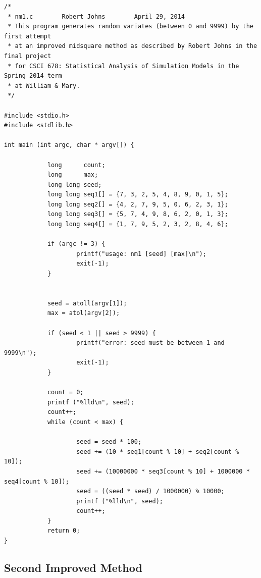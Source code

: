 \documentclass[11pt]{article}
\begin{document}
\begin{verbatim}/* 
 * nm1.c		Robert Johns		April 29, 2014
 * This program generates random variates (between 0 and 9999) by the first attempt
 * at an improved midsquare method as described by Robert Johns in the final project
 * for CSCI 678: Statistical Analysis of Simulation Models in the Spring 2014 term
 * at William & Mary.  
 */

#include <stdio.h>
#include <stdlib.h>

int main (int argc, char * argv[]) {
	
        	long 	  count;
        	long 	  max;
        	long long seed;
        	long long seq1[] = {7, 3, 2, 5, 4, 8, 9, 0, 1, 5};
        	long long seq2[] = {4, 2, 7, 9, 5, 0, 6, 2, 3, 1};
        	long long seq3[] = {5, 7, 4, 9, 8, 6, 2, 0, 1, 3};
        	long long seq4[] = {1, 7, 9, 5, 2, 3, 2, 8, 4, 6};
	
        	if (argc != 3) {
                	printf("usage: nm1 [seed] [max]\n");
                	exit(-1);
        	}
	
	
        	seed = atoll(argv[1]);
        	max = atol(argv[2]);
	
        	if (seed < 1 || seed > 9999) {
                	printf("error: seed must be between 1 and 9999\n");
                	exit(-1);
        	}
	
        	count = 0;
        	printf ("%lld\n", seed);
        	count++;
        	while (count < max) {
		
                	seed = seed * 100;
                	seed += (10 * seq1[count % 10] + seq2[count % 10]);
                	seed += (10000000 * seq3[count % 10] + 1000000 * seq4[count % 10]);
                	seed = ((seed * seed) / 1000000) % 10000;
                	printf ("%lld\n", seed);
                	count++;	
        	}
        	return 0;
}\end{verbatim}

\newpage
\subsection{Second Improved Method}
\end{document}
